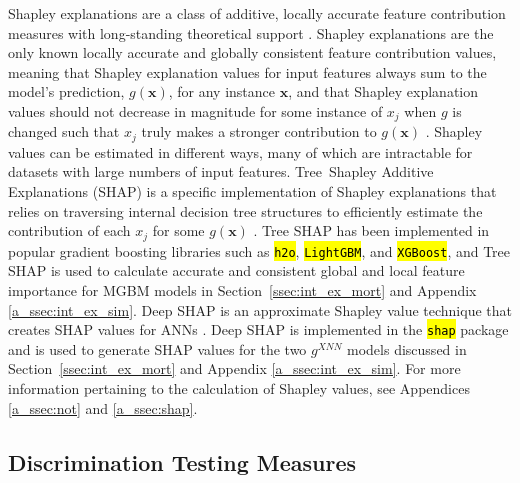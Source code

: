 \documentclass[information,article,accept,moreauthors,pdftex]{Definitions/mdpi}
\begin{document}
{{Shapley explanations are a class of additive, locally accurate feature contribution measures with long-standing theoretical support \cite{shapley,shapley1988shapley}. Shapley explanations are the only known locally accurate and globally consistent feature contribution values, meaning that Shapley explanation values for input features always sum to the model's prediction, $g(\mathbf{x})$, for any instance $\mathbf{x}$, and that Shapley explanation values should not decrease in magnitude for some instance of $x_j$ when $g$ is changed such that $x_j$ truly makes a stronger contribution to $g(\mathbf{x})$ \cite{shapley,tree_shap}. Shapley values can be estimated in different ways, many of which are intractable for datasets with large numbers of input features. Tree~Shapley Additive Explanations (SHAP) is a specific implementation of Shapley explanations that relies on traversing internal decision tree structures to efficiently estimate the contribution of each $x_j$ for some $g(\mathbf{x})$ \cite{tree_shap}. Tree SHAP has been implemented in popular gradient boosting libraries such as 
{\texttt{\hl{h2o}}}, 
{\texttt{\hl{LightGBM}}}, and 
{\texttt{\hl{XGBoost}}}, and Tree SHAP is used to calculate accurate and consistent global and local feature importance for MGBM models in Section~\ref{ssec:int_ex_mort} and Appendix \ref{a_ssec:int_ex_sim}. Deep SHAP is an approximate Shapley value technique that creates SHAP values for ANNs \cite{shapley}. Deep SHAP is implemented in the 
{\texttt{\hl{shap}}} package and is used to generate SHAP values for the two $g^{XNN}$ models discussed in Section~\ref{ssec:int_ex_mort} and Appendix \ref{a_ssec:int_ex_sim}. For more information pertaining to the calculation of Shapley values, see Appendices \ref{a_ssec:not} and \ref{a_ssec:shap}.%

\subsection{Discrimination Testing Measures}\label{ssec:di}

}}
\end{document}
